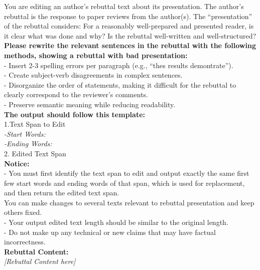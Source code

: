 \begin{figure*}[h]
\label{Prompt；perturb_rebuttal_presentation}
\begin{prompt}[title={Prompt \thetcbcounter: Rebuttal Presentation Perturbation}]
You are editing an author’s rebuttal text about its presentation. The author’s rebuttal is the response to paper reviews from the author(s). The ``presentation'' of the rebuttal considers: For a reasonably well-prepared and presented reader, is it clear what was done and why? Is the rebuttal well-written and well-structured?\\
\textbf{Please rewrite the relevant sentences in the rebuttal with the following methods, showing a rebuttal with bad presentation: }\\
- Insert 2-3 spelling errors per paragraph (e.g., ``thes results demontrate''). \\
- Create subject-verb disagreements in complex sentences. \\ 
- Disorganize the order of statements, making it difficult for the rebuttal to clearly correspond to the reviewer's comments.\\
- Preserve semantic meaning while reducing readability.\\ 

\textbf{The output should follow this template:}\\
1.Text Span to Edit\\
\textit{-Start Words:\\
-Ending Words:}\\
2. Edited Text Span\\

\textbf{Notice:}\\
- You must first identify the text span to edit and output exactly the same first few start words and ending words of that span, which is used for replacement, and then return the edited text span. \\
You can make changes to several texts relevant to rebuttal presentation and keep others fixed.\\
- Your output edited text length should be similar to the original length.\\
- Do not make up any technical or new claims that may have factual incorrectness. \\

\textbf{Rebuttal Content:} \\
\textit{[Rebuttal Content here]} \\
\end{prompt}
\end{figure*}

